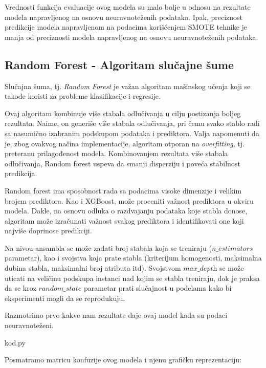 \documentclass[12pt]{article}
\theoremstyle{definition}
\theoremstyle{remark}
\begin{document}
\hfill

Vrednosti funkcija evaluacije ovog modela su malo bolje u odnosu na rezultate modela napravljenog na osnovu neuravnoteženih podataka. Ipak, preciznost predikcije modela napravljenom na podacima korišćenjem SMOTE tehnike je manja od preciznosti modela napravljenog na osnovu neuravnoteženih podataka.


\subsection{Random Forest - Algoritam slučajne šume}

Slučajna šuma, tj. \emph{Random Forest} je važan algoritam mašinskog učenja koji se takođe koristi za probleme klasifikacije i regresije.

Ovaj algoritam kombinuje više stabala odlučivanja u cilju postizanja boljeg rezultata. Naime, on generiše više stabala odlučivanja, pri čemu svako stablo radi sa nasumično izabranim podskupom podataka i prediktora. Valja napomenuti da je, zbog ovakvog načina implementacije, algoritam otporan na \emph{overfitting}, tj. preteranu prilagođenost modela. Kombinovanjem rezultata više stabala odlučivanja, Random forest uspeva da smanji disperziju i poveća stabilnost predikcija.

Random forest ima sposobnost rada sa podacima visoke dimenzije i velikim brojem prediktora. Kao i XGBoost, može proceniti važnost prediktora u okviru modela. Dakle, na osnovu odluka o razdvajanju podataka koje stabla donose, algoritam može izračunati važnost svakog prediktora i identifikovati one koji najviše doprinose predikciji.

Na nivou ansambla se može zadati broj stabala koja se treniraju ($\textit{n\_estimators}$ parametar), kao i svojstva koja prate stabla (kriterijum homogenosti, maksimalna dubina stabla, maksimalni broj atributa itd). Svojstvom $\textit{max\_depth}$ se može uticati na veličinu podskupa instanci nad kojim se stabla treniraju, dok je praksa da se kroz $\textit{random\_state}$ parametar prati slučajnost u podelama kako bi eksperimenti mogli da se reprodukuju.

Razmotrimo prvo kakve nam rezultate daje ovaj model kada su podaci neuravnoteženi.

\hfill

{kod.py}

Posmatramo matricu konfuzije ovog modela i njenu grafičku reprezentaciju:
\end{document}
